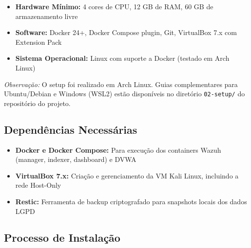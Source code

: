\documentclass[12pt,a4paper]{article}
\begin{document}
    \begin{itemize}
        \item \textbf{Hardware Mínimo:} 4 cores de CPU, 12 GB de RAM, 60 GB de armazenamento livre
        \item \textbf{Software:} Docker 24+, Docker Compose plugin, Git, VirtualBox 7.x com Extension Pack
        \item \textbf{Sistema Operacional:} Linux com suporte a Docker (testado em Arch Linux)
    \end{itemize}

    \noindent\textit{Observação:} O setup foi realizado em Arch Linux. Guias complementares para Ubuntu/Debian e Windows (WSL2) estão disponíveis no diretório \texttt{02-setup/} do repositório do projeto.

    \subsection{Dependências Necessárias}

    \begin{itemize}
        \item \textbf{Docker e Docker Compose:} Para execução dos containers Wazuh (manager, indexer, dashboard) e DVWA
        \item \textbf{VirtualBox 7.x:} Criação e gerenciamento da VM Kali Linux, incluindo a rede Host-Only
        \item \textbf{Restic:} Ferramenta de backup criptografado para snapshots locais dos dados LGPD
    \end{itemize}

    \subsection{Processo de Instalação}
\end{document}
